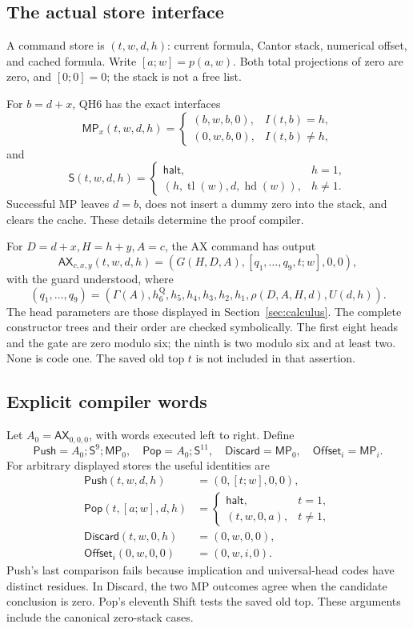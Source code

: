 \documentclass[11pt,letterpaper]{article}
\newcommand{\AX}{\mathsf{AX}}
\newcommand{\MP}{\mathsf{MP}}
\newcommand{\Shift}{\mathsf{S}}
\begin{document}
\subsection{The actual store interface}

A command store is \((t,w,d,h)\): current formula, Cantor stack, numerical
offset, and cached formula. Write \([a;w]=p(a,w)\). Both total projections
of zero are zero, and \([0;0]=0\); the stack is not a free list.

For \(b=d+x\), QH6 has the exact interfaces
\[
 \MP_x(t,w,d,h)=
 \begin{cases}(b,w,b,0),&I(t,b)=h,\\(0,w,b,0),&I(t,b)\ne h,\end{cases}
\]
and
\[
 \Shift(t,w,d,h)=
 \begin{cases}\mathsf{halt},&h=1,\\
 (h,\operatorname{tl}(w),d,\operatorname{hd}(w)),&h\ne1.
 \end{cases}
\]
Successful MP leaves \(d=b\), does not insert a dummy zero into the stack,
and clears the cache. These details determine the proof compiler.

For \(D=d+x,H=h+y,A=c\), the AX command has output
\[
 \AX_{c,x,y}(t,w,d,h)=
  (G(H,D,A),[q_1,\ldots,q_9,t;w],0,0),
\]
with the guard understood, where
\[
 (q_1,\ldots,q_9)=
 (\Gamma(A),h_6^{\mathrm Q},h_5,h_4,h_3,h_2,h_1,
   \rho(D,A,H,d),U(d,h)).
\]
The head parameters are those displayed in Section~\ref{sec:calculus}.
The complete constructor trees and their order are checked symbolically.
The first eight heads and the gate are zero modulo six; the ninth is two
modulo six and at least two. None is code one. The saved old top \(t\)
is not included in that assertion.

\subsection{Explicit compiler words}

Let \(A_0=\AX_{0,0,0}\), with words executed left to right. Define
\[
 \mathsf{Push}=A_0;\Shift^9;\MP_0,\quad
 \mathsf{Pop}=A_0;\Shift^{11},\quad
 \mathsf{Discard}=\MP_0,\quad \mathsf{Offset}_i=\MP_i.
\]
For arbitrary displayed stores the useful identities are
\begin{align*}
 \mathsf{Push}(t,w,d,h)&=(0,[t;w],0,0),\\
 \mathsf{Pop}(t,[a;w],d,h)&=
  \begin{cases}\mathsf{halt},&t=1,\\(t,w,0,a),&t\ne1,\end{cases}\\
 \mathsf{Discard}(t,w,0,h)&=(0,w,0,0),\\
 \mathsf{Offset}_i(0,w,0,0)&=(0,w,i,0).
\end{align*}
Push's last comparison fails because implication and universal-head codes
have distinct residues. In Discard, the two MP outcomes agree when the
candidate conclusion is zero. Pop's eleventh Shift tests the saved old top.
These arguments include the canonical zero-stack cases.
\end{document}
